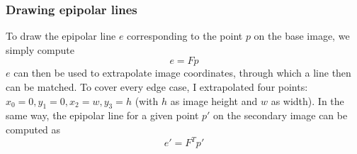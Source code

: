 \documentclass{paper}
\begin{document}
\subsubsection{Drawing epipolar lines}
To draw the epipolar line $e$ corresponding to the point $p$ on the base image, we simply compute
\begin{equation}
	e = F p
\end{equation}
$e$ can then be used to extrapolate image coordinates, through which a line then can be matched. 
To cover every edge case, I extrapolated four points: $x_0 = 0, y_1 = 0, x_2 = w, y_3 = h$ (with $h$ as image height and $w$ as width). 
In the same way, the epipolar line for a given point $p'$ on the secondary image can be computed as
\begin{equation}
	e' = F^Tp'
\end{equation} 
\end{document}
